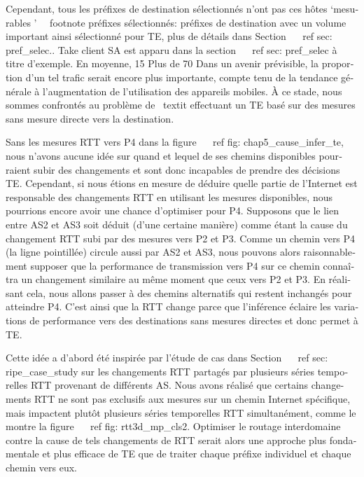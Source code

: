 \begin{otherlanguage}{french}
{{%
Cependant, tous les préfixes de destination sélectionnés n'ont pas ces hôtes `mesurables '~ \ footnote {préfixes sélectionnés: préfixes de destination avec un volume important ainsi sélectionné pour TE, plus de détails dans Section ~ \ ref {sec: pref_selec}.}.
Take client SA est apparu dans la section ~ \ ref {sec: pref_selec} à titre d'exemple.
En moyenne, 15%
Plus de 70%
Dans un avenir prévisible, la proportion d'un tel trafic serait encore plus importante, compte tenu de la tendance générale à l'augmentation de l'utilisation des appareils mobiles.
À ce stade, nous sommes confrontés au problème de \ textit {effectuant un TE basé sur des mesures sans mesure directe vers la destination}.

Sans les mesures RTT vers P4 dans la figure ~ \ ref {fig: chap5_cause_infer_te}, nous n'avons aucune idée sur quand et lequel de ses chemins disponibles pourraient subir des changements et sont donc incapables de prendre des décisions TE.
Cependant, si nous étions en mesure de déduire quelle partie de l'Internet est responsable des changements RTT en utilisant les mesures disponibles, nous pourrions encore avoir une chance d'optimiser pour P4.
Supposons que le lien entre AS2 et AS3 soit déduit (d'une certaine manière) comme étant la cause du changement RTT subi par des mesures vers P2 et P3.
Comme un chemin vers P4 (la ligne pointillée) circule aussi par AS2 et AS3, nous pouvons alors raisonnablement supposer que la performance de transmission vers P4 sur ce chemin connaîtra un changement similaire au même moment que ceux vers P2 et P3.
En réalisant cela, nous allons passer à des chemins alternatifs qui restent inchangés pour atteindre P4.
C'est ainsi que la RTT change parce que l'inférence éclaire les variations de performance vers des destinations sans mesures directes et donc permet à TE.

Cette idée a d'abord été inspirée par l'étude de cas dans Section ~ \ ref {sec: ripe_case_study} sur les changements RTT partagés par plusieurs séries temporelles RTT provenant de différents AS.
Nous avons réalisé que certains changements RTT ne sont pas exclusifs aux mesures sur un chemin Internet spécifique, mais impactent plutôt plusieurs séries temporelles RTT simultanément, comme le montre la figure ~ \ ref {fig: rtt3d_mp_cls2}.
Optimiser le routage interdomaine contre la cause de tels changements de RTT serait alors une approche plus fondamentale et plus efficace de TE que de traiter chaque préfixe individuel et chaque chemin vers eux.

}}
\end{otherlanguage}
